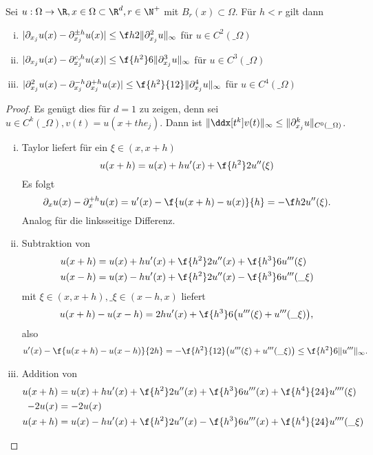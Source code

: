 \begin{st}[Approximationsgüte] \label{2.2}
	Sei $u: \Omega \to \R, x \in \Omega \subset \R^d, r \in \N^+$ mit $B_r(x) \subset \Omega$.	
	Für $h < r$ gilt dann
	\begin{enumerate}[i)]
		\item
			$|\partial_{x_j} u(x) - \partial_{x_j}^{\pm h} u(x)| \le \f h2 \|\partial_{x_j}^2 u\|_\infty$ für $u \in C^2(\_\Omega)$
		\item
			$|\partial_{x_j} u(x) - \partial_{x_j}^{c, h} u(x)| \le \f {h^2}6 \|\partial_{x_j}^3 u\|_\infty$ für $u \in C^3(\_\Omega)$
		\item
			$|\partial_{x_j}^2 u(x) - \partial_{x_j}^{-h} \partial_{x_j}^{+h} u(x)| \le \f {h^2}{12} \|\partial_{x_j}^4 u\|_\infty$ für $u \in C^4(\_\Omega)$
	\end{enumerate}
	\begin{proof}
		Es genügt dies für $d = 1$ zu zeigen, denn  sei $u \in C^k(\_\Omega), v(t) = u(x + th e_j)$.
		Dann ist $\|\ddx[t^k] v(t)\|_\infty \le \|\partial_{x_j}^k u\|_{C^0(\_\Omega)}$.
		\begin{enumerate}[i)]
			\item
				Taylor liefert für ein $\xi \in (x, x + h)$
				\[
					u(x+h) = u(x) + hu'(x) + \f {h^2}2 u''(\xi)
				\]
				Es folgt
				\[
					\partial_x u(x) - \partial_x^{+h} u(x)
					= u'(x) - \f{u(x+h) - u(x)}{h}
					= - \f h2 u''(\xi).
				\]
				Analog für die linksseitige Differenz.
			\item
				Subtraktion von
				\begin{align*}
					u(x+h) &= u(x) + hu'(x) + \f {h^2}2 u''(x) + \f {h^3}6 u'''(\xi) \\
					u(x-h) &= u(x) - hu'(x) + \f {h^2}2 u''(x) - \f {h^3}6 u'''(\_\xi) \\
				\end{align*}
				mit $\xi \in (x,x+h), \_\xi \in (x-h,x)$ liefert
				\[
					u(x+h) - u(x-h) = 2h u'(x) + \f{h^3}6 \big(u'''(\xi) + u'''(\_\xi)\big),
				\]
				also
				\[
					u'(x) - \f{u(x+h) - u(x-h)}{2h}
					= - \f{h^2}{12} \big( u'''(\xi) + u'''(\_\xi) \big)
					\le \f{h^2}6 \|u'''\|_\infty.
				\]
			\item
				Addition von
				\begin{align*}
					u(x+h) &= u(x) + hu'(x) + \f{h^2}2 u''(x) + \f {h^3}6 u'''(x) + \f{h^4}{24} u''''(\xi) \\
					-2u(x) &= -2u(x) \\
					u(x+h) &= u(x) - hu'(x) + \f{h^2}2 u''(x) - \f {h^3}6 u'''(x) + \f{h^4}{24} u''''(\_\xi) \\

\end{align*}
\end{enumerate}
\end{proof}
\end{st}
